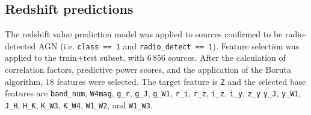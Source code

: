\documentclass{aa}
\begin{document}
\subsection{Redshift predictions}\label{sec:results_redshift}

The redshift value prediction model was applied to sources confirmed to be radio-detected AGN (i.e. \texttt{class~==~1} and \texttt{radio\_detect~==~1}).
Feature selection was applied to the train+test subset, with $6\,856$ sources. After the calculation of correlation factors, predictive power scores, and the application of the Boruta algorithm, $18$ features were selected. The target feature is \verb|Z| and the selected base features are \verb|band_num|, \verb|W4mag|, \verb|g_r|, \verb|g_J|, \verb|g_W1|, \verb|r_i|, \verb|r_z|, \verb|i_z|, \verb|i_y|, \verb|z_y| \verb|y_J|, \verb|y_W1|, \verb|J_H|, \verb|H_K|, \verb|K_W3|, \verb|K_W4|, \verb|W1_W2|, and \verb|W1_W3|.
\\
\begin{table}
\setlength{\tabcolsep}{3pt}
\caption{Results of initial fit for redshift value prediction}             %
\label{table:fit_redshift_models}      %
\centering                          %
\end{table}
\end{document}

